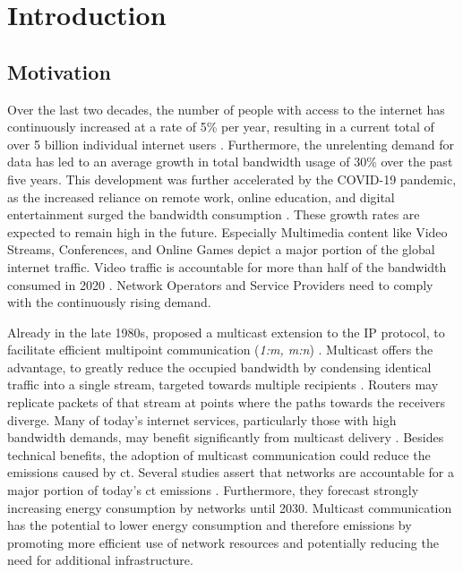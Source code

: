 \chapter{Introduction} %
\label{chap:Introduction}


\section{Motivation} %
\label{sec:Motivation}


Over the last two decades, the number of people with access to the internet has
    continuously increased at a rate of 5\% per year, resulting in a current
    total of over 5 billion individual internet users \cite{itu_digdev}.
Furthermore, the unrelenting demand for data has led to an average growth in
    total bandwidth usage of 30\% over the past five years.
This development was further accelerated by the COVID-19 pandemic, as the
    increased reliance on remote work, online education, and digital
    entertainment surged the bandwidth consumption \cite{cartesian_us_bw}.
These growth rates are expected to remain high in the future.
Especially Multimedia content like Video Streams, Conferences, and Online Games
    depict a major portion of the global internet traffic.
Video traffic is accountable for more than half of the bandwidth consumed in
    2020 \cite{cartesian_us_bw}.
Network Operators and Service Providers need to comply with the continuously
    rising demand.

Already in the late 1980s, \citeauthor{deering1990multicast} proposed a
    multicast extension to the IP protocol, to facilitate efficient multipoint
    communication (\textit{1:m, m:n})
    \cite{deering1990multicast, rfc1112_ip4mc}.
Multicast offers the advantage, to greatly reduce the occupied bandwidth by
    condensing identical traffic into a single stream, targeted towards
    multiple recipients \cite{rfc3376_igmp}.
Routers may replicate packets of that stream at points where the paths towards 
    the receivers diverge.
Many of today's internet services, particularly those with high bandwidth
    demands, may benefit significantly from multicast delivery
    \cite{ratnasamy2006revisiting, meadcast1}.
Besides technical benefits, the adoption of multicast communication could
    reduce the emissions caused by \gls{ct}.
Several studies assert that networks are accountable for a major portion of
    today's \gls{ct} emissions \cite{andrae2015global}.
Furthermore, they forecast strongly increasing energy consumption by networks
    until 2030.
Multicast communication has the potential to lower energy consumption and
    therefore emissions by promoting more efficient use of network resources
    and potentially reducing the need for additional infrastructure.


